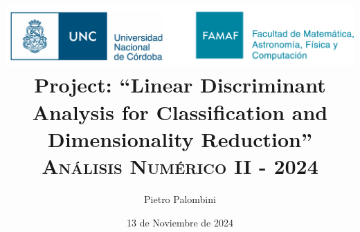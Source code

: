 \documentclass[a4paper,12pt]{article}
\begin{document}
\title{
\includegraphics[scale=0.3]{logo_UNC-FAMAF.png} \\
Project: ``Linear Discriminant Analysis for Classification and Dimensionality Reduction'' \\
\textsc{\footnotesize Análisis Numérico II - 2024}
}
\author{Pietro Palombini}
\date{13 de Noviembre de 2024}
\maketitle









\end{document}
